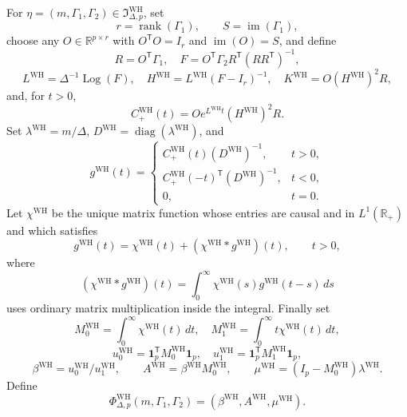 For \(\eta=(m,\Gamma_1,\Gamma_2)\in\mathfrak I_{\Delta,p}^{\mathrm{WH}}\), set
\[
 r=\operatorname{rank}(\Gamma_1),\qquad S=\operatorname{im}(\Gamma_1),
\]
choose any \(O\in\mathbb R^{p\times r}\) with \(O^{\mathsf T}O=I_r\) and \(\operatorname{im}(O)=S\), and define
\[
 R=O^{\mathsf T}\Gamma_1,\quad
 F=O^{\mathsf T}\Gamma_2R^{\mathsf T}(RR^{\mathsf T})^{-1},
\]
\[
 L^{\mathrm{WH}}=\Delta^{-1}\operatorname{Log}(F),\quad
 H^{\mathrm{WH}}=L^{\mathrm{WH}}(F-I_r)^{-1},\quad
 K^{\mathrm{WH}}=O(H^{\mathrm{WH}})^2R,
\]
and, for \(t>0\),
\[
 C_{+}^{\mathrm{WH}}(t)=Oe^{L^{\mathrm{WH}}t}(H^{\mathrm{WH}})^2R.
\]
Set \(\lambda^{\mathrm{WH}}=m/\Delta\), \(D^{\mathrm{WH}}=\operatorname{diag}(\lambda^{\mathrm{WH}})\), and
\[
 g^{\mathrm{WH}}(t)=
 \begin{cases}
 C_{+}^{\mathrm{WH}}(t)(D^{\mathrm{WH}})^{-1},&t>0,\\
 C_{+}^{\mathrm{WH}}(-t)^{\mathsf T}(D^{\mathrm{WH}})^{-1},&t<0,\\
 0,&t=0.
 \end{cases}
\]
Let \(\chi^{\mathrm{WH}}\) be the unique matrix function whose entries are causal and in \(L^1(\mathbb R_+)\) and which satisfies
\[
 g^{\mathrm{WH}}(t)=\chi^{\mathrm{WH}}(t)
 +(\chi^{\mathrm{WH}}*g^{\mathrm{WH}})(t),\qquad t>0,
\]
where
\[
 (\chi^{\mathrm{WH}}*g^{\mathrm{WH}})(t)
 =\int_0^\infty\chi^{\mathrm{WH}}(s)g^{\mathrm{WH}}(t-s)\,ds
\]
uses ordinary matrix multiplication inside the integral.  Finally set
\[
 M_0^{\mathrm{WH}}=\int_0^\infty\chi^{\mathrm{WH}}(t)\,dt,\quad
 M_1^{\mathrm{WH}}=\int_0^\infty t\chi^{\mathrm{WH}}(t)\,dt,
\]
\[
 u_0^{\mathrm{WH}}=\mathbf 1_p^{\mathsf T}M_0^{\mathrm{WH}}\mathbf 1_p,\quad
 u_1^{\mathrm{WH}}=\mathbf 1_p^{\mathsf T}M_1^{\mathrm{WH}}\mathbf 1_p,
\]
\[
 \beta^{\mathrm{WH}}=u_0^{\mathrm{WH}}/u_1^{\mathrm{WH}},\qquad
 A^{\mathrm{WH}}=\beta^{\mathrm{WH}}M_0^{\mathrm{WH}},\qquad
 \mu^{\mathrm{WH}}=(I_p-M_0^{\mathrm{WH}})\lambda^{\mathrm{WH}}.
\]
Define
\[
 \Phi_{\Delta,p}^{\mathrm{WH}}(m,\Gamma_1,\Gamma_2)
 =(\beta^{\mathrm{WH}},A^{\mathrm{WH}},\mu^{\mathrm{WH}}).
\]